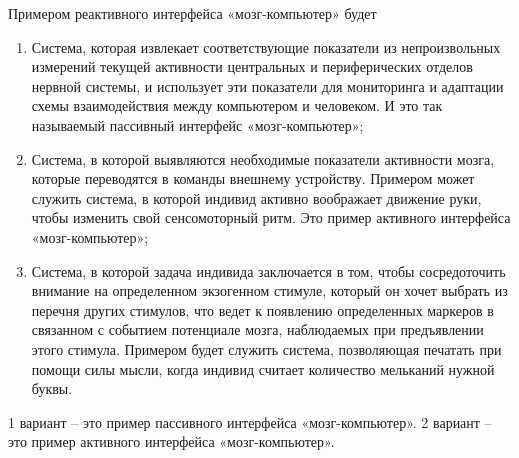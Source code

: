
Примером реактивного интерфейса «мозг-компьютер» будет

\begin{enumerate}
    \item Система, которая извлекает соответствующие показатели из непроизвольных измерений текущей активности центральных и периферических отделов нервной системы, и использует эти показатели для мониторинга и адаптации схемы взаимодействия между компьютером и человеком. И это так называемый пассивный интерфейс «мозг-компьютер»;
    \item Система, в которой выявляются необходимые показатели активности мозга, которые переводятся в команды внешнему устройству. Примером может служить система, в которой индивид активно воображает движение руки, чтобы изменить свой сенсомоторный ритм. Это пример активного интерфейса «мозг-компьютер»;
    \item Система, в которой задача индивида заключается в том, чтобы сосредоточить внимание на определенном экзогенном стимуле, который он хочет выбрать из перечня других стимулов, что ведет к появлению определенных маркеров в связанном с событием потенциале мозга, наблюдаемых при предъявлении этого стимула. Примером будет служить система, позволяющая печатать при помощи силы мысли, когда индивид считает количество мельканий нужной буквы.
\end{enumerate}

\explanationSection

1 вариант – это пример пассивного интерфейса «мозг-компьютер». 2 вариант – это пример активного интерфейса «мозг-компьютер».

